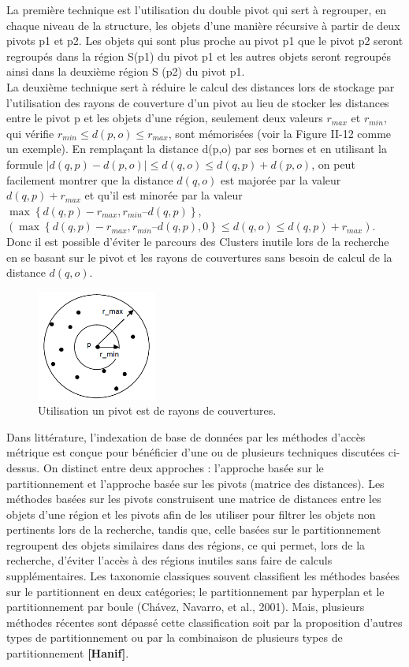 La première technique est l’utilisation du double pivot qui sert à regrouper, en chaque niveau de la structure, les objets d’une manière récursive à partir de deux pivots p1 et p2. Les objets qui sont plus proche au pivot p1 que le pivot p2 seront regroupés dans la région S(p1) du
pivot p1 et les autres objets seront regroupés ainsi dans la deuxième région S (p2) du pivot p1.\\

La deuxième technique sert à réduire le calcul des distances lors de stockage par l’utilisation des rayons de couverture d’un pivot au lieu de stocker les distances entre le pivot p et les objets d'une région, seulement deux valeurs $ r_{max} $ et $ r_{min} $, qui vérifie $  r_{min}  \le d(p,o) \le r_{max}  $, sont mémorisées (voir la Figure II-12 comme un exemple). En remplaçant la distance d(p,o) par ses bornes et en utilisant la formule $ |d(q,p)-d(p,o)| \le d(q,o) \le d(q,p)+d(p,o) $, on peut facilement montrer que la distance $ d(q,o) $ est majorée par la valeur $ d(q,p) + r_{max} $ et qu’il est minorée par la valeur $ \max \left\{d(q,p) - r_{max} , r_{min} – d(q,p)\right\} $,$  (\max \left\{ d(q,p) - r_{max} , r_{min} – d(q,p), 0\right\} \le d(q,o) \le d(q,p) + r_{max} ) $. Donc il est possible d’éviter le parcours des Clusters inutile lors de la recherche en se basant sur le pivot et les rayons de couvertures sans besoin de calcul de la distance $ d(q,o) $.
\begin{figure}[H]
	\centering
	\includegraphics[width=0.35\textwidth]{Figures/radius.png} %
	\caption{Utilisation un pivot est de rayons de couvertures.}
\end{figure}

Dans littérature, l’indexation de base de données par les méthodes d’accès métrique est conçue pour bénéficier d’une ou de plusieurs techniques discutées ci-dessus. On distinct entre deux approches : l’approche basée sur le partitionnement et l’approche basée sur les pivots (matrice des distances). Les méthodes basées sur les pivots construisent une matrice de
distances entre les objets d’une région et les pivots afin de les utiliser pour filtrer les objets non pertinents lors de la recherche, tandis que, celle basées sur le partitionnement regroupent des objets similaires dans des régions, ce qui permet, lors de la recherche, d’éviter l’accès à
des régions inutiles sans faire de calculs supplémentaires. Les taxonomie classiques souvent classifient les méthodes basées sur le partitionnent en deux catégories; le partitionnement par hyperplan et le partitionnement par boule (Chávez, Navarro, et al., 2001). Mais, plusieurs méthodes récentes sont dépassé cette classification soit par la proposition d’autres types de partitionnement ou par la combinaison de plusieurs types de partitionnement \textbf{[Hanif]}. 


